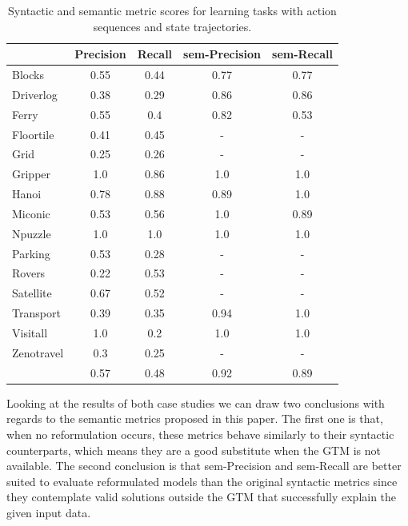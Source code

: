 \begin{table}[hbt!]
    \begin{footnotesize}
	\begin{center}		
		\begin{tabular}{l|c|c|c|c|}		
			& {\bf Precision} & {\bf Recall} & {\bf sem-Precision} & {\bf sem-Recall} \\
			\hline
			Blocks & 0.55 & 0.44 & 0.77 & 0.77 \\
			Driverlog & 0.38 & 0.29 & 0.86 & 0.86 \\
			Ferry & 0.55 & 0.4 & 0.82 & 0.53 \\
			Floortile & 0.41 & 0.45 & - & - \\
			Grid & 0.25 & 0.26 & - & - \\
			Gripper & 1.0 & 0.86 & 1.0 & 1.0 \\
			Hanoi & 0.78 & 0.88 & 0.89 & 1.0 \\
			Miconic & 0.53 & 0.56 & 1.0 & 0.89 \\
			Npuzzle & 1.0 & 1.0 & 1.0 & 1.0 \\
			Parking & 0.53 & 0.28 & - & - \\
			Rovers & 0.22 & 0.53 & - & - \\
			Satellite & 0.67 & 0.52 & - & - \\
			Transport & 0.39 & 0.35 & 0.94 & 1.0 \\
			Visitall & 1.0 & 0.2 & 1.0 & 1.0 \\
			Zenotravel & 0.3 & 0.25 & - & - \\
			\hline
			& 0.57 & 0.48 & 0.92 & 0.89
		\end{tabular}
	\end{center}
    \end{footnotesize}
	\caption{\small Syntactic and semantic metric scores for learning tasks with \NO action sequences and \NO state trajectories.}
	\label{tab:metric_comparison_0_0}
\end{table}

Looking at the results of both case studies we can draw two conclusions with regards to the semantic metrics proposed in this paper. The first one is that, when no reformulation occurs, these metrics behave similarly to their syntactic counterparts, which means they are a good substitute when the GTM is not available. The second conclusion is that sem-Precision and sem-Recall are better suited to evaluate reformulated models than the original syntactic metrics since they contemplate valid solutions outside the GTM that successfully explain the given input data.
